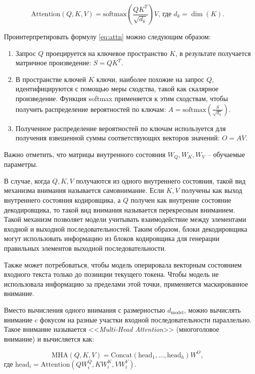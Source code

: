 \begin{equation}
    \text{Attention}\left(Q,K,V\right) = \text{softmax}\left(\frac{QK^T}{\sqrt{d_k}}\right)V\text{, где }d_k = \dim(K).
    \label{eq:attn}
\end{equation}

Проинтерпретировать формулу \ref{eq:attn} можно следующим образом:

\begin{enumerate}
    \item Запрос $Q$ проецируется на ключевое пространство $K$, в результате получается матричное произведение: $S = QK^T$.
    \item В пространстве ключей $K$ ключи, наиболее похожие на запрос $Q$, идентифицируются с помощью меры сходства, такой как скалярное произведение. Функция softmax применяется к этим сходствам, чтобы получить распределение вероятностей по ключам: $A=\text{softmax}\left(\frac{S}{\sqrt{d_k}}\right)$.
    \item Полученное распределение вероятностей по ключам используется для получения взвешенной суммы соответствующих векторов значений: $O=AV$.
\end{enumerate}

Важно отметить, что матрицы внутренного состояния $W_Q,W_K,W_V$ -- обучаемые параметры.

В случае, когда $Q, K, V$ получаются из одного внутреннего состояния, такой вид механизма внимания называется самовнимание. Если $K, V$ получены как выход внутреннего состояния кодировщика, а $Q$ получен как внутренне состояние декодировщика, то такой вид внимания называется перекресным вниманием. Такой механизм позволяет модели учитывать взаимодействие между элементами входной и выходной последовательностей. Таким образом, блоки декодировщика могут использовать информацию из блоков кодировщика для генерации правильных элементов выходной последовательности.

Также может потребоваться, чтобы модель оперировала векторным состоянием входного текста только до позииции текущего токена. Чтобы модель не использовала информацию за пределами этой точки, применяется маскированное внимание.

Вместо вычисления одного внимания с размерностью $d_{\text{model}}$, можно вычислять внимание c фокусом на разные участки входной последовательности параллельно. Такое внимание называется <<\textit{Multi-Head Attention}>> (многоголовое внимание) и вычисляется как:

\begin{equation}
    \text{MHA}(Q, K, V) = \text{Concat}(\text{head}_1, \dots, \text{head}_h) W^O,
\end{equation}
где $\text{head}_i = \text{Attention}(QW_i^Q, KW_i^K, VW_i^V)$.

